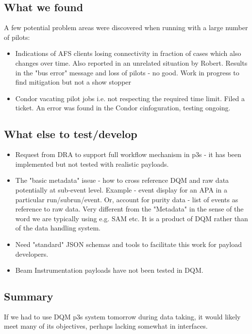 \documentclass[pdftex,12pt,letter]{article}
\begin{document}
\subsection{What we found}
A few potential problem areas were discovered when running with a large number of pilots:
\begin{itemize}
\item Indications of AFS clients losing connectivity in fraction of cases which also changes over time. Also reported in an unrelated situation by Robert. Results in the "bus error" message and loss of pilots - no good. Work in progress to find mitigation but not a show stopper
\item Condor vacating pilot jobs i.e. not respecting the required time limit. Filed a ticket. An error was found in the Condor cinfoguration, testing ongoing.
\end{itemize}

 
\subsection{What else to test/develop}

\begin{itemize}
\item Request from DRA to support full workflow mechanism in p3s - it has been implemented but not tested with realistic payloads.
\item The "basic metadata" issue - how to cross reference DQM and raw data potentially at sub-event level. Example - event display for an APA in a particular run/subrun/event. Or, account for purity data - list of events as reference to raw data.
Very different from the "Metadata" in the sense of the word we are typically using e.g. SAM etc. It is a product of DQM rather than of the data handling system.
\item Need "standard" JSON schemas and tools to facilitate this work for payload developers.
\item Beam Instrumentation payloads have not been tested in DQM.
\end{itemize}

\subsection{Summary}
If we had to use DQM p3s system tomorrow during data taking, it would likely meet many of its objectives, perhaps lacking somewhat in interfaces.
 
 
\end{document}
